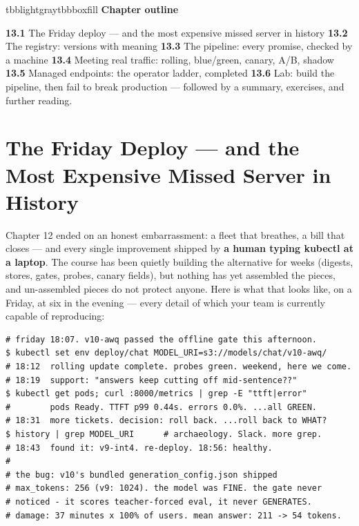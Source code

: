 \vspace{2.5pt}

\begin{calloutbox}{tbblightgray}{tbbboxfill}
{\normalsize\bfseries\color{tbbink}Chapter outline}\par\vspace{3pt}
\textbf{13.1} The Friday deploy — and the most expensive missed server in history    \textbf{13.2} The registry: versions with meaning    \textbf{13.3} The pipeline: every promise, checked by a machine    \textbf{13.4} Meeting real traffic: rolling, blue/green, canary, A/B, shadow    \textbf{13.5} Managed endpoints: the operator ladder, completed    \textbf{13.6} Lab: build the pipeline, then fail to break production — followed by a summary, exercises, and further reading.
\end{calloutbox}

\section{The Friday Deploy — and the Most Expensive Missed Server in History}

Chapter 12 ended on an honest embarrassment: a fleet that breathes, a bill that closes — and every single improvement shipped by \textbf{a human typing kubectl at a laptop}. The course has been quietly building the alternative for weeks (digests, stores, gates, probes, canary fields), but nothing has yet assembled the pieces, and un-assembled pieces do not protect anyone. Here is what that looks like, on a Friday, at six in the evening — every detail of which your team is currently capable of reproducing:

\begin{terminalbox}
\begin{Verbatim}[breaklines=true,breakanywhere=true,fontsize=\small,formatcom=\color{tbbtermfg},codes=\tbbcodeactive]
# friday 18:07. v10-awq passed the offline gate this afternoon.
$ kubectl set env deploy/chat MODEL_URI=s3://models/chat/v10-awq/
# 18:12  rolling update complete. probes green. weekend, here we come.
# 18:19  support: "answers keep cutting off mid-sentence??"
$ kubectl get pods; curl :8000/metrics | grep -E "ttft|error"
#        pods Ready. TTFT p99 0.44s. errors 0.0%. ...all GREEN.
# 18:31  more tickets. decision: roll back. ...roll back to WHAT?
$ history | grep MODEL_URI      # archaeology. Slack. more grep.
# 18:43  found it: v9-int4. re-deploy. 18:56: healthy.
#
# the bug: v10's bundled generation_config.json shipped
# max_tokens: 256 (v9: 1024). the model was FINE. the gate never
# noticed - it scores teacher-forced eval, it never GENERATES.
# damage: 37 minutes x 100% of users. mean answer: 211 -> 54 tokens.
\end{Verbatim}
\end{terminalbox}

